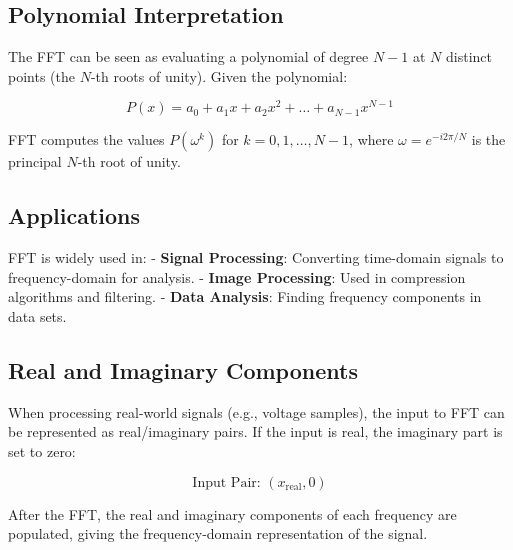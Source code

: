 \documentclass{article}
\begin{document}
\subsection{Polynomial Interpretation}

The FFT can be seen as evaluating a polynomial of degree \(N-1\) at \(N\) distinct points (the \(N\)-th roots of unity). Given the polynomial:

\[
P(x) = a_0 + a_1 x + a_2 x^2 + \dots + a_{N-1} x^{N-1}
\]

FFT computes the values \(P(\omega^k)\) for \(k = 0, 1, \dots, N-1\), where \(\omega = e^{-i 2 \pi / N}\) is the principal \(N\)-th root of unity.

\subsection{Applications}

FFT is widely used in:
- \textbf{Signal Processing}: Converting time-domain signals to frequency-domain for analysis.
- \textbf{Image Processing}: Used in compression algorithms and filtering.
- \textbf{Data Analysis}: Finding frequency components in data sets.

\subsection{Real and Imaginary Components}

When processing real-world signals (e.g., voltage samples), the input to FFT can be represented as real/imaginary pairs. If the input is real, the imaginary part is set to zero:

\[
\text{Input Pair: } (x_{\text{real}}, 0)
\]

After the FFT, the real and imaginary components of each frequency are populated, giving the frequency-domain representation of the signal.
\end{document}
